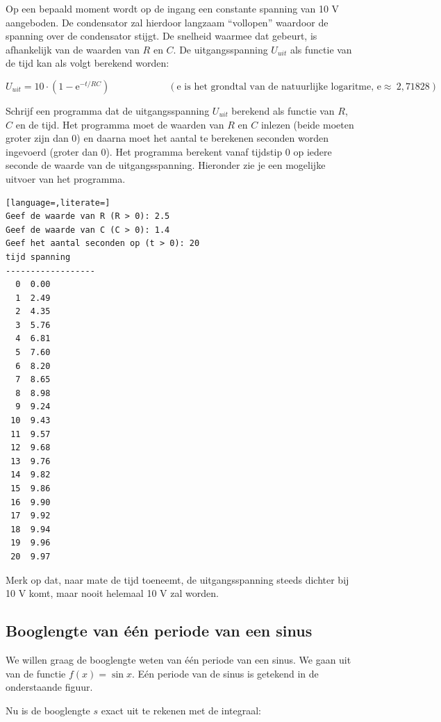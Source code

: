 \documentclass[a4paper,10pt,fleqn,twoside]{article}
\begin{document}
Op een bepaald moment wordt op de ingang een constante spanning van 10 V aangeboden. De condensator zal hierdoor langzaam ``vollopen'' waardoor de spanning over de condensator stijgt. De snelheid waarmee dat gebeurt, is afhankelijk van de waarden van $R$ en $C$.
De uitgangsspanning $U_{uit}$ als functie van de tijd kan als volgt berekend worden:

\begin{equation*}
U_{uit} = 10\cdot(1-\mathrm{e}^{-t/RC}) \qquad\qquad\qquad (\text{e is het grondtal van de natuurlijke logaritme, e}\approx\ 2,71828)
\end{equation*}


Schrijf een programma dat de uitgangsspanning $U_{uit}$ berekend als functie van $R$, $C$ en de tijd. Het programma moet de waarden van $R$ en $C$ inlezen (beide moeten groter zijn dan 0) en daarna moet het aantal te berekenen seconden worden ingevoerd (groter dan 0). Het programma berekent vanaf tijdstip 0 op iedere seconde de waarde van de uitgangsspanning. Hieronder zie je een mogelijke uitvoer van het programma.

\begin{lstlisting}[language=,literate=]
Geef de waarde van R (R > 0): 2.5
Geef de waarde van C (C > 0): 1.4
Geef het aantal seconden op (t > 0): 20
tijd spanning
------------------
  0  0.00
  1  2.49
  2  4.35
  3  5.76
  4  6.81
  5  7.60
  6  8.20
  7  8.65
  8  8.98
  9  9.24
 10  9.43
 11  9.57
 12  9.68
 13  9.76
 14  9.82
 15  9.86
 16  9.90
 17  9.92
 18  9.94
 19  9.96
 20  9.97
\end{lstlisting}

Merk op dat, naar mate de tijd toeneemt, de uitgangsspanning steeds dichter bij 10 V komt, maar nooit helemaal 10 V zal worden.

\subsection{Booglengte van één periode van een sinus}
We willen graag de booglengte weten van één periode van een sinus. We gaan uit van de functie $f(x) = \sin x$. Eén periode van de sinus is getekend in de onderstaande figuur.

\begin{figure}[H]
\centering
{}%
\end{figure}
Nu is de booglengte $s$ exact uit te rekenen met de integraal:
\end{document}
